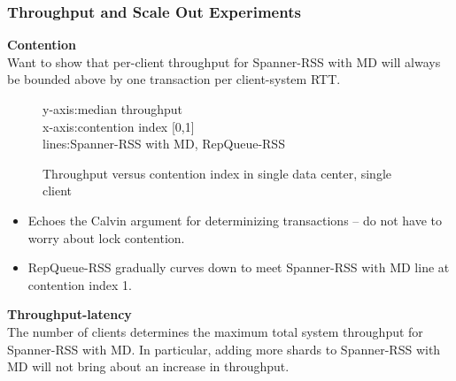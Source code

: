 \documentclass[letterpaper, 11pt]{article}
\begin{document}
\subsubsection{Throughput and Scale Out Experiments}
\textbf{Contention} \\
Want to show that per-client throughput for Spanner-RSS with MD will always be bounded above by one transaction per client-system RTT.
\begin{figure}[H]
  \centering
  \begin{tcolorbox}[width=0.5\textwidth, sharp corners=all, frame empty]
    y-axis:median throughput\\
    x-axis:contention index [0,1] \\
    lines:Spanner-RSS with MD, RepQueue-RSS
  \end{tcolorbox}
  \caption{Throughput versus contention index in single data center, single client}
\end{figure}
\begin{itemize}
\item Echoes the Calvin argument for determinizing transactions -- do not have to worry about lock contention.
\item RepQueue-RSS gradually curves down to meet Spanner-RSS with MD line at contention index 1. 
\end{itemize}
\textbf{Throughput-latency}\\
The number of clients determines the maximum total system throughput for Spanner-RSS with MD. In particular, adding more shards to Spanner-RSS with MD will not bring about an increase in throughput.
\end{document}
